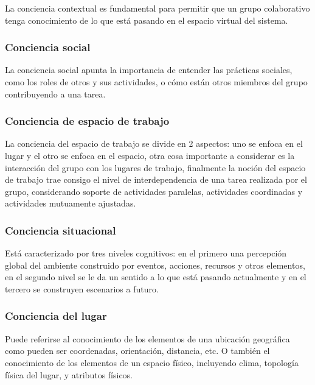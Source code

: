 La conciencia contextual es fundamental para permitir que un grupo colaborativo tenga conocimiento de lo que est\'a pasando en el espacio virtual del sistema.

\subsubsection{Conciencia social}

La conciencia social \cite{antunes2014reviewing} apunta la importancia de entender las pr\'acticas sociales, como los roles de otros y sus actividades, o c\'omo est\'an otros miembros del grupo contribuyendo a una tarea.

\subsubsection{Conciencia de espacio de trabajo}

La conciencia del espacio de trabajo se divide en 2 aspectos: uno se enfoca en el lugar y el otro se enfoca en el espacio, otra cosa importante a considerar es la interacci\'on del grupo con los lugares de trabajo, finalmente la noci\'on del espacio de trabajo trae consigo el nivel de interdependencia de una tarea realizada por el grupo, considerando soporte de actividades paralelas, actividades coordinadas y actividades mutuamente ajustadas.

\subsubsection{Conciencia situacional}

Est\'a caracterizado por tres niveles cognitivos: en el primero una percepci\'on global del ambiente construido por eventos, acciones, recursos y otros elementos, en el segundo nivel se le da un sentido a lo que est\'a pasando actualmente y en el tercero se construyen escenarios a futuro.

\subsubsection{Conciencia del lugar}

Puede referirse al conocimiento de los elementos de una ubicaci\'on geogr\'afica como pueden ser coordenadas, orientaci\'on, distancia, etc. O tambi\'en el conocimiento de los elementos de un espacio f\'isico, incluyendo clima, topolog\'ia f\'isica del lugar, y atributos f\'isicos.

\newpage
\subsection*{}

